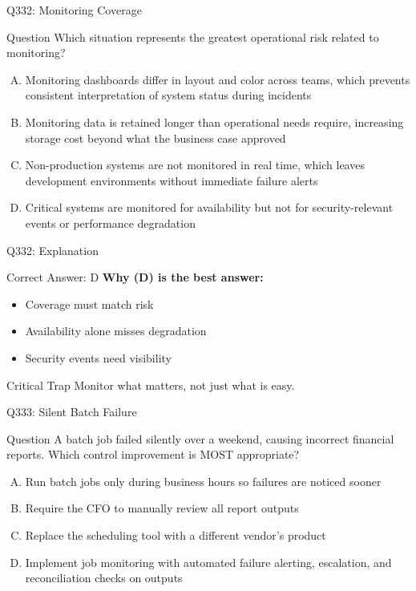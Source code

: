 \documentclass{beamer}
\begin{document}
	\begin{frame}{Q332: Monitoring Coverage}
		\begin{block}{Question}
			\small Which situation represents the greatest operational risk related to monitoring?
		\end{block}
		\begin{enumerate}[(A)]
			\footnotesize
			\item Monitoring dashboards differ in layout and color across teams, which prevents consistent interpretation of system status during incidents
			\item Monitoring data is retained longer than operational needs require, increasing storage cost beyond what the business case approved
			\item Non-production systems are not monitored in real time, which leaves development environments without immediate failure alerts
			\item Critical systems are monitored for availability but not for security-relevant events or performance degradation
		\end{enumerate}
	\end{frame}
	
	\begin{frame}{Q332: Explanation}
		\begin{block}{Correct Answer: D}
			\textbf{Why (D) is the best answer:}
			\begin{itemize}
				\item Coverage must match risk
				\item Availability alone misses degradation
				\item Security events need visibility
			\end{itemize}
		\end{block}
		\begin{alertblock}{Critical Trap}
			Monitor what matters, not just what is easy.
		\end{alertblock}
	\end{frame}
	
	\begin{frame}{Q333: Silent Batch Failure}
		\begin{block}{Question}
			\small A batch job failed silently over a weekend, causing incorrect financial reports. Which control improvement is MOST appropriate?
		\end{block}
		\begin{enumerate}[(A)]
			\footnotesize
			\item Run batch jobs only during business hours so failures are noticed sooner
			\item Require the CFO to manually review all report outputs
			\item Replace the scheduling tool with a different vendor's product
			\item Implement job monitoring with automated failure alerting, escalation, and reconciliation checks on outputs
		\end{enumerate}
	\end{frame}
	
\end{document}
